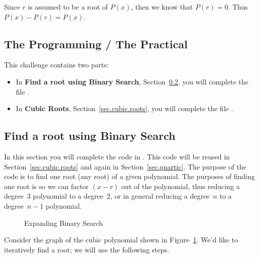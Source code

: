 Since $r$ is assumed to be a root of $P(x)$, then we know that $P(r)=0$.  Thus $P(x)-P(r)=P(x)$.

\subsection{The Programming / The Practical}

This challenge contains two parts:
\begin{itemize}
\item In \textbf{Find a root using Binary Search}, Section~\ref{sec.binary.search}, you will complete the file .
\item In \textbf{Cubic Roots}, Section~\ref{sec.cubic.roots}, you will complete the file .
\end{itemize}

\subsection{Find a root using Binary Search}
\label{sec.binary.search}

In this section you will complete the code in .
This code will be reused in Section~\ref{sec.cubic.roots} and again in
Section~\ref{sec.quartic}.  The purpose of the code is to find one
root (any root) of a given polynomial.  The purposes of finding one
root is so we can factor $(x-r)$ out of the polynomial, thus reducing
a degree~3 polynomial to a degree~2, or in general reducing a degree~$n$ to a degree~$n-1$ polynomial.

\begin{figure}
  \centering

  \caption{Expanding Binary Search} 
  \label{fig.cubic.binary}
\end{figure}

Consider the graph of the cubic polynomial shown in Figure~\ref{fig.cubic.binary}.  We'd like to
iteratively find a root; we will use the following steps.

